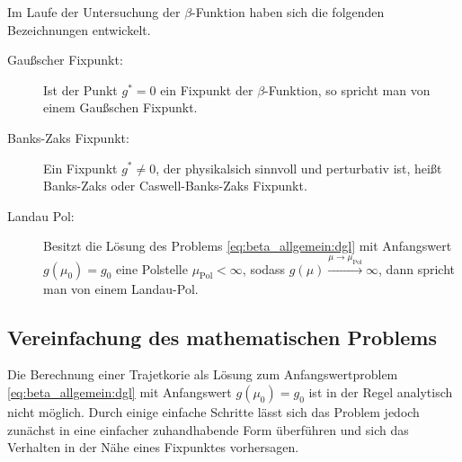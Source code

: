   Im Laufe der Untersuchung der $\beta$-Funktion haben sich die folgenden Bezeichnungen 
  entwickelt.
  \begin{description}
   \item[Gaußscher Fixpunkt: ] Ist der Punkt $g^*=0$ ein Fixpunkt der $\beta$-Funktion, so 
			      spricht man von einem Gaußschen Fixpunkt.
   \item[Banks-Zaks Fixpunkt: ] Ein Fixpunkt $g^*\neq 0$, der physikalsich sinnvoll und 
			      perturbativ ist, heißt Banks-Zaks oder 
			      Caswell-Banks-Zaks Fixpunkt.
   \item[Landau Pol: ] Besitzt die Lösung des Problems \eqref{eq:beta_allgemein:dgl} mit 
		      Anfangswert $g(\mu_0)=g_0$ eine Polstelle $\mu_\text{Pol}<\infty$, sodass 
		      $g(\mu)\overset{\mu\to\mu_\text{Pol}}{\longrightarrow}\infty$, dann spricht 
		      man von einem Landau-Pol.
  \end{description}
  
  \subsection{Vereinfachung des mathematischen Problems}
      Die Berechnung einer Trajetkorie als Lösung zum Anfangswertproblem 
      \eqref{eq:beta_allgemein:dgl} mit Anfangswert $g(\mu_0)=g_0$ 
      ist in der Regel analytisch nicht möglich. Durch einige einfache Schritte lässt sich das 
      Problem jedoch zunächst in eine einfacher zuhandhabende Form überführen und sich das 
      Verhalten in der Nähe eines Fixpunktes vorhersagen.
      
